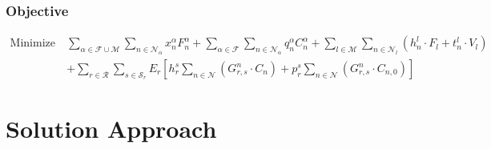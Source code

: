 \subsubsection{Objective}
\begin{align*}
   \text{Minimize} ~ & \sum_{\alpha \in \mathcal{F}\cup\mathcal{M}} \sum_{n\in \mathcal{N}_{\alpha}} x_{n}^{\alpha} F_{n}^{\alpha} + \sum_{\alpha \in \mathcal{F}}\sum_{n\in \mathcal{N}_{\alpha}} q_{n}^{\alpha} C_{n}^{\alpha} + \sum_{l\in \mathcal{M}}\sum_{n\in \mathcal{N}_{l}}\left( h_{n}^{l}\cdot F_{l} + t_{n}^{l}\cdot V_{l} \right) \\
  & + \sum_{r\in\mathcal{R}}\sum_{s\in \mathcal{S}_{r}}E_{r}\left[ h_{r}^{s}\sum_{n\in \mathcal{N}}\left(G_{r,s}^{n}\cdot C_n\right) + p_{r}^s\sum_{n\in \mathcal{N}}\left(G_{r,s}^n\cdot C_{n,0}\right) \right]
\end{align*}



\section{Solution Approach}\label{sec:locomotive:algorithm}

